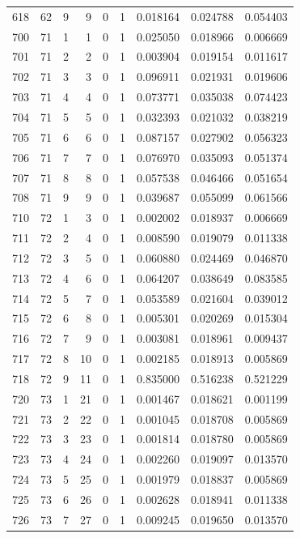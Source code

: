 \begin{longtable}{rrrrrrrrr}
618 & 62 & 9 & 9 & 0 & 1 & 0.018164 & 0.024788 & 0.054403 \\
700 & 71 & 1 & 1 & 0 & 1 & 0.025050 & 0.018966 & 0.006669 \\
701 & 71 & 2 & 2 & 0 & 1 & 0.003904 & 0.019154 & 0.011617 \\
702 & 71 & 3 & 3 & 0 & 1 & 0.096911 & 0.021931 & 0.019606 \\
703 & 71 & 4 & 4 & 0 & 1 & 0.073771 & 0.035038 & 0.074423 \\
704 & 71 & 5 & 5 & 0 & 1 & 0.032393 & 0.021032 & 0.038219 \\
705 & 71 & 6 & 6 & 0 & 1 & 0.087157 & 0.027902 & 0.056323 \\
706 & 71 & 7 & 7 & 0 & 1 & 0.076970 & 0.035093 & 0.051374 \\
707 & 71 & 8 & 8 & 0 & 1 & 0.057538 & 0.046466 & 0.051654 \\
708 & 71 & 9 & 9 & 0 & 1 & 0.039687 & 0.055099 & 0.061566 \\
710 & 72 & 1 & 3 & 0 & 1 & 0.002002 & 0.018937 & 0.006669 \\
711 & 72 & 2 & 4 & 0 & 1 & 0.008590 & 0.019079 & 0.011338 \\
712 & 72 & 3 & 5 & 0 & 1 & 0.060880 & 0.024469 & 0.046870 \\
713 & 72 & 4 & 6 & 0 & 1 & 0.064207 & 0.038649 & 0.083585 \\
714 & 72 & 5 & 7 & 0 & 1 & 0.053589 & 0.021604 & 0.039012 \\
715 & 72 & 6 & 8 & 0 & 1 & 0.005301 & 0.020269 & 0.015304 \\
716 & 72 & 7 & 9 & 0 & 1 & 0.003081 & 0.018961 & 0.009437 \\
717 & 72 & 8 & 10 & 0 & 1 & 0.002185 & 0.018913 & 0.005869 \\
718 & 72 & 9 & 11 & 0 & 1 & 0.835000 & 0.516238 & 0.521229 \\
720 & 73 & 1 & 21 & 0 & 1 & 0.001467 & 0.018621 & 0.001199 \\
721 & 73 & 2 & 22 & 0 & 1 & 0.001045 & 0.018708 & 0.005869 \\
722 & 73 & 3 & 23 & 0 & 1 & 0.001814 & 0.018780 & 0.005869 \\
723 & 73 & 4 & 24 & 0 & 1 & 0.002260 & 0.019097 & 0.013570 \\
724 & 73 & 5 & 25 & 0 & 1 & 0.001979 & 0.018837 & 0.005869 \\
725 & 73 & 6 & 26 & 0 & 1 & 0.002628 & 0.018941 & 0.011338 \\
726 & 73 & 7 & 27 & 0 & 1 & 0.009245 & 0.019650 & 0.013570 \\

\end{longtable}
